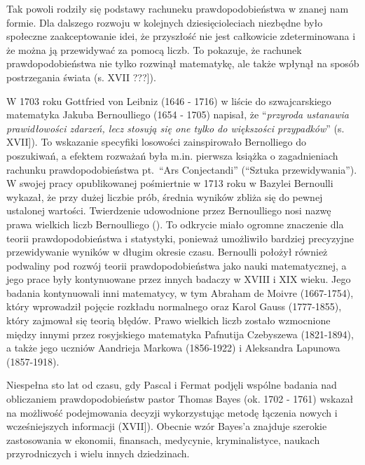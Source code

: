 \documentclass[
  letterpaper,
  DIV=11,
  numbers=noendperiod]{scrreprt}
\begin{document}
Tak powoli rodziły się podstawy rachuneku prawdopodobieństwa w znanej
nam formie. Dla dalszego rozwoju w kolejnych dziesięcioleciach niezbędne
było społeczne zaakceptowanie idei, że przyszłość nie jest całkowicie
zdeterminowana i że można ją przewidywać za pomocą liczb. To pokazuje,
że rachunek prawdopodobieństwa nie tylko rozwinął matematykę, ale także
wpłynął na sposób postrzegania świata
(\citeproc{ref-bernstein1997}{Bernstein et al., 1997}{[}s. XVII ???{]}).

W 1703 roku Gottfried von Leibniz (1646 - 1716) w liście do
szwajcarskiego matematyka Jakuba Bernoulliego (1654 - 1705) napisał, że
``\emph{przyroda ustanawia prawidłowości zdarzeń, lecz stosują się one
tylko do większości przypadków}''
(\citeproc{ref-bernstein1997}{Bernstein et al., 1997}{[}s. XVII{]}). To
wskazanie specyfiki losowości zainspirowało Bernolliego do poszukiwań, a
efektem rozważań była m.in. pierwsza książka o zagadnieniach rachunku
prawdopodobieństwa pt.~``Ars Conjectandi'' (``Sztuka przewidywania''). W
swojej pracy opublikowanej pośmiertnie w 1713 roku w Bazylei Bernoulli
wykazał, że przy dużej liczbie prób, średnia wyników zbliża się do
pewnej ustalonej wartości. Twierdzenie udowodnione przez Bernoulliego
nosi nazwę prawa wielkich liczb Bernoulliego
(). To odkrycie miało ogromne
znaczenie dla teorii prawdopodobieństwa i statystyki, ponieważ
umożliwiło bardziej precyzyjne przewidywanie wyników w długim okresie
czasu. Bernoulli położył również podwaliny pod rozwój teorii
prawdopodobieństwa jako nauki matematycznej, a jego prace były
kontynuowane przez innych badaczy w XVIII i XIX wieku. Jego badania
kontynuowali inni matematycy, w tym Abraham de Moivre (1667-1754), który
wprowadził pojęcie rozkładu normalnego oraz Karol Gauss (1777-1855),
który zajmował się teorią błędów. Prawo wielkich liczb zostało
wzmocnione między innymi przez rosyjskiego matematyka Pafnutija
Czebyszewa (1821-1894), a także jego uczniów Aandrieja Markowa
(1856-1922) i Aleksandra Lapunowa (1857-1918).

Niespełna sto lat od czasu, gdy Pascal i Fermat podjęli wspólne badania
nad obliczaniem prawdopodobieństw pastor Thomas Bayes (ok. 1702 - 1761)
wskazał na możliwość podejmowania decyzji wykorzystując metodę łączenia
nowych i wcześniejszych informacji
(\citeproc{ref-bernstein1997}{Bernstein et al., 1997}{[}XVII{]}).
Obecnie wzór Bayes'a znajduje szerokie zastosowania w ekonomii,
finansach, medycynie, kryminalistyce, naukach przyrodniczych i wielu
innych dziedzinach.
\end{document}
